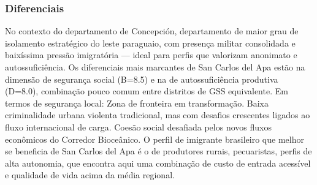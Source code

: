 \subsubsection*{Diferenciais}\label{dif-san-carlos-del-apa-0105}
No contexto do departamento de Concepción, departamento de maior grau de isolamento estratégico do leste paraguaio, com presença militar consolidada e baixíssima pressão imigratória — ideal para perfis que valorizam anonimato e autossuficiência. Os diferenciais mais marcantes de San Carlos del Apa estão na dimensão de segurança social (B=8.5) e na de autossuficiência produtiva (D=8.0), combinação pouco comum entre distritos de GSS equivalente. Em termos de segurança local: Zona de fronteira em transformação. Baixa criminalidade urbana violenta tradicional, mas com desafios crescentes ligados ao fluxo internacional de carga. Coesão social desafiada pelos novos fluxos econômicos do Corredor Bioceânico. O perfil de imigrante brasileiro que melhor se beneficia de San Carlos del Apa é o de produtores rurais, pecuaristas, perfis de alta autonomia, que encontra aqui uma combinação de custo de entrada acessível e qualidade de vida acima da média regional.
